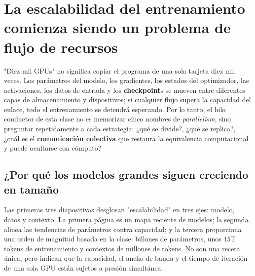 \section{La escalabilidad del entrenamiento comienza siendo un problema de flujo de recursos}

"Diez mil GPUs" no significa copiar el programa de una sola tarjeta diez mil veces. Los parámetros del modelo, los gradientes, los estados del optimizador, las activaciones, los datos de entrada y los \textbf{checkpoint}s se mueven entre diferentes capas de almacenamiento y dispositivos; si cualquier flujo supera la capacidad del enlace, todo el entrenamiento se detendrá esperando. Por lo tanto, el hilo conductor de esta clase no es memorizar cinco nombres de \textit{parallelism}, sino preguntar repetidamente a cada estrategia: ¿qué se divide?, ¿qué se replica?, ¿cuál es el \textbf{comunicación colectiva} que restaura la equivalencia computacional y puede ocultarse con cómputo?

\subsection{¿Por qué los modelos grandes siguen creciendo en tamaño}

Las primeras tres diapositivas desglosan "escalabilidad" en tres ejes: modelo, datos y contexto. La primera página es un mapa reciente de modelos; la segunda alinea las tendencias de parámetros contra capacidad; y la tercera proporciona una orden de magnitud basada en la clase: billones de parámetros, unos $15$T tokens de entrenamiento y contextos de millones de tokens. No son una receta única, pero indican que la capacidad, el ancho de banda y el tiempo de iteración de una sola GPU están sujetos a presión simultánea.




